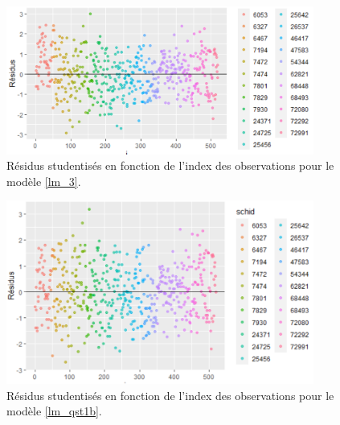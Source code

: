 \documentclass{article}
\begin{document}
\begin{figure}[H]  %
	\centering
	\includegraphics[width=0.9\textwidth]{graphiques/residus_VS_id_qst1a}
	\caption{Résidus studentisés en fonction de l'index des observations pour le modèle \ref{lm_3}.}
	\label{residus_VS_id_qst1a}
\end{figure}

\begin{figure}[H]  %
	\centering
	\includegraphics[width=0.9\textwidth]{graphiques/residus_VS_id_qst1b}
	\caption{Résidus studentisés en fonction de l'index des observations pour le modèle \ref{lm_qst1b}.}
	\label{residus_VS_id_qst1b}
\end{figure}
\end{document}
